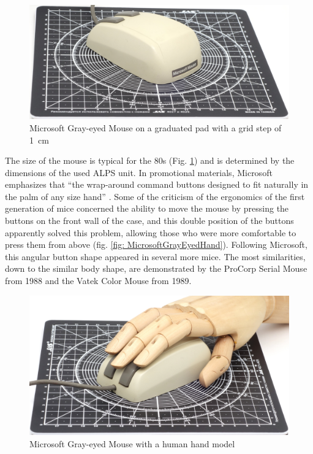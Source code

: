 \documentclass[11pt, a4paper]{article}
\begin{document}
\begin{figure}[h]
    \centering
    \includegraphics[scale=0.5]{1985_microsoft_gray_eyed_mouse/size_30.jpg}
    \caption{Microsoft Gray-eyed Mouse on a graduated pad with a grid step of 1~cm}
    \label{fig:MicrosoftGrayEyedSize}
\end{figure}

The size of the mouse is typical for the 80s (Fig. \ref{fig:MicrosoftGrayEyedSize}) and is determined by the dimensions of the used ALPS unit. In promotional materials, Microsoft emphasizes that ``the wrap-around command buttons designed to fit naturally in the palm of any size hand'' \cite{mouses}. Some of the criticism of the ergonomics of the first generation of mice concerned the ability to move the mouse by pressing the buttons on the front wall of the case, and this double position of the buttons apparently solved this problem, allowing those who were more comfortable to press them from above (fig. \ref{fig: MicrosoftGrayEyedHand}). Following Microsoft, this angular button shape appeared in several more mice. The most similarities, down to the similar body shape, are demonstrated by the ProCorp Serial Mouse from 1988 and the Vatek Color Mouse from 1989.

\begin{figure}[h]
    \centering
    \includegraphics[scale=0.5]{1985_microsoft_gray_eyed_mouse/hand_30.jpg}
    \caption{Microsoft Gray-eyed Mouse with a human hand model}
    \label{fig:MicrosoftGrayEyedHand}
\end{figure}
\end{document}
